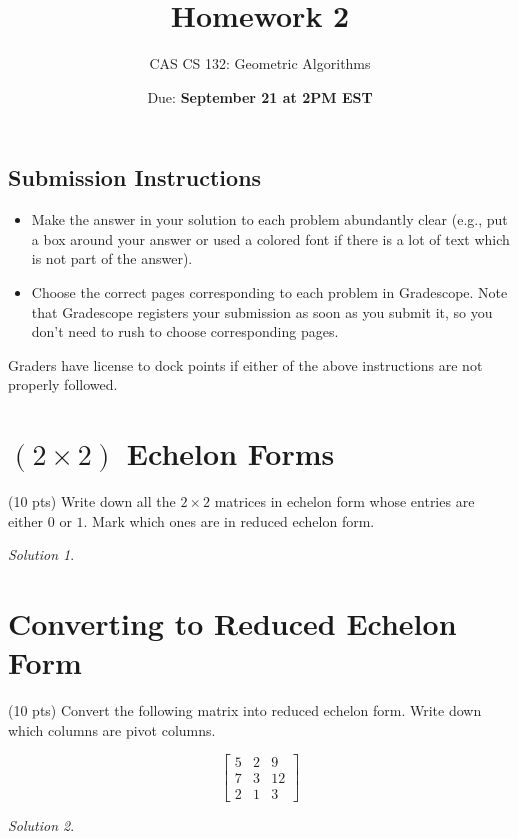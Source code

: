 \documentclass{article}
\title{Homework 2}
\author{CAS CS 132: Geometric Algorithms}
\date{Due: \textbf{September 21 at 2PM EST}}
\theoremstyle{remark}
\newtheorem*{solution}{Solution}
\begin{document}
\maketitle

\subsection*{Submission Instructions}
\begin{itemize}
\item Make the answer in your solution to each problem abundantly clear (e.g., put a box around your answer or used a colored font if there is a lot of text which is not part of the answer).
\item Choose the correct pages corresponding to each problem in Gradescope. Note that Gradescope registers your submission as soon as you submit it, so you don't need to rush to choose corresponding pages.
\end{itemize}
Graders have license to dock points if either of the above instructions are not properly followed.

\pagebreak
\section{$(2 \times 2)$ Echelon Forms}

(10 pts) Write down all the $2 \times 2$ matrices in echelon form whose entries are either $0$ or $1$.
Mark which ones are in reduced echelon form.

\begin{solution}
\end{solution}

\pagebreak
\section{Converting to Reduced Echelon Form}

(10 pts) Convert the following matrix into reduced echelon form.
Write down which columns are pivot columns.

\begin{displaymath}
  \begin{bmatrix}
    5 & 2 & 9 \\
    7 & 3 & 12 \\
    2 & 1 & 3
  \end{bmatrix}
\end{displaymath}

\begin{solution}
\end{solution}
\end{document}

